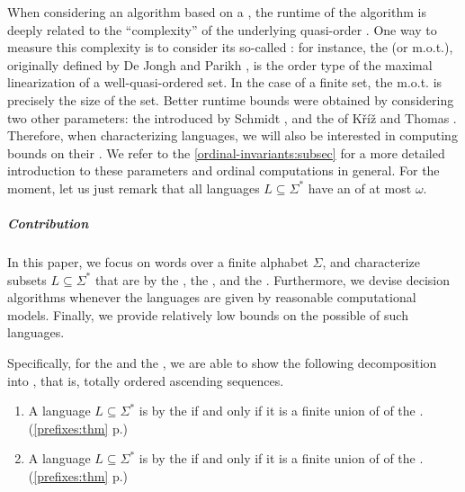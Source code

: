 \AP When considering an algorithm based on a , the
runtime of the algorithm is deeply related to the ``complexity'' of the
underlying quasi-order . One way to measure this complexity is to
consider its so-called : for instance, the
 (or m.o.t.), originally defined by De Jongh and
Parikh \cite{dejongh77}, is the order type of the maximal linearization of a
well-quasi-ordered set. In the case of a finite set, the m.o.t. is precisely
the size of the set. Better runtime bounds were obtained by considering two
other parameters: the 
introduced by Schmidt \cite{schmidt81}, and the  of Kříž
and Thomas \cite{kriz90b}. Therefore, when characterizing
 languages, we will also be interested in computing
bounds on their . We refer to the
\cref{ordinal-invariants:subsec} for a more detailed introduction to these
parameters and ordinal computations in general. For the moment, let us just
remark that all languages $L \subseteq \Sigma^*$ have an  of
at most $\omega$.

\subparagraph{Contribution} In this paper, we focus on words over a finite
alphabet $\Sigma$, and characterize subsets $L \subseteq \Sigma^*$ that are
 by the , the ,
and the . Furthermore, we devise decision algorithms
whenever the languages are given by reasonable computational models. Finally,
we provide relatively low bounds on the possible  of
such languages.

Specifically, for the  and the
, we are able to show the following decomposition into
, that is, totally ordered ascending sequences.

{
\renewcommand{\labelenumi}{R\arabic{enumi}}
\begin{enumerate}
	\item A language $L \subseteq \Sigma^*$ is  by the  if and only if it is a finite union of  of the .
    \hfill (\cref{prefixes:thm} p.\pageref{prefixes:thm})
	\item A language $L \subseteq \Sigma^*$ is  by the  if and only if it is a finite union of  of the .
    \hfill (\cref{prefixes:thm} p.\pageref{prefixes:thm})
\end{enumerate}
}

